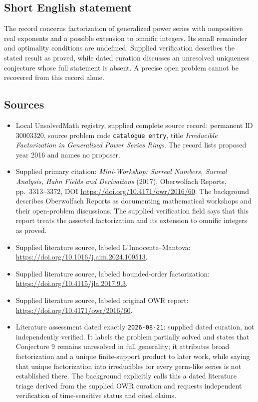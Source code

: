 \documentclass[11pt]{article}
\begin{document}
\subsection{Short English statement}
The record concerns factorization of generalized power series with nonpositive real exponents and a possible extension to omnific integers. Its small remainder and optimality conditions are undefined. Supplied verification describes the stated result as proved, while dated curation discusses an unresolved uniqueness conjecture whose full statement is absent. A precise open problem cannot be recovered from this record alone.
\subsection{Sources}
\begin{itemize}
\item Local UnsolvedMath registry, supplied complete source record: permanent ID \(30003320\), source problem code \texttt{catalogue entry}, title \emph{Irreducible Factorization in Generalized Power Series Rings}. The record lists proposed year 2016 and names no proposer.
\item Supplied primary citation: \emph{Mini-Workshop: Surreal Numbers, Surreal Analysis, Hahn Fields and Derivations} (2017), Oberwolfach Reports, pp.~3313--3372, DOI \url{https://doi.org/10.4171/owr/2016/60}. The background describes Oberwolfach Reports as documenting mathematical workshops and their open-problem discussions. The supplied verification field says that this report treats the asserted factorization and its extension to omnific integers as proved.
\item Supplied literature source, labeled L'Innocente--Mantova: \url{https://doi.org/10.1016/j.aim.2024.109513}.
\item Supplied literature source, labeled bounded-order factorization: \url{https://doi.org/10.4115/jla.2017.9.3}.
\item Supplied literature source, labeled original OWR report: \url{https://doi.org/10.4171/owr/2016/60}.
\item Literature assessment dated exactly \texttt{2026-08-21}: supplied dated curation, not independently verified. It labels the problem partially solved and states that Conjecture 9 remains unresolved in full generality; it attributes broad factorization and a unique finite-support product to later work, while saying that unique factorization into irreducibles for every germ-like series is not established there. The background explicitly calls this a dated literature triage derived from the supplied OWR curation and requests independent verification of time-sensitive status and cited claims.
\end{itemize}
\end{document}
